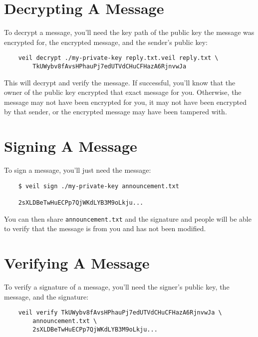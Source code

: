 \documentclass[a4paper]{scrartcl}
\begin{document}
    \section{Decrypting A Message}\label{sec:decrypting-a-message}

    To decrypt a message, you'll need the key path of the public key the message was encrypted for, the encrypted
    message, and the sender's public key:

    \begin{verbatim}
    veil decrypt ./my-private-key reply.txt.veil reply.txt \
        TkUWybv8fAvsHPhauPj7edUTVdCHuCFHazA6RjnvwJa
    \end{verbatim}

    This will decrypt and verify the message.
    If successful, you'll know that the owner of the public key encrypted that exact message for you.
    Otherwise, the message may not have been encrypted for you, it may not have been encrypted by that sender, or the
    encrypted message may have been tampered with.


    \section{Signing A Message}\label{sec:signing-a-message}

    To sign a message, you'll just need the message:

    \begin{verbatim}
    $ veil sign ./my-private-key announcement.txt

    2sXLDBeTwHuECPp7QjWKdLYB3M9oLkju...
    \end{verbatim}

    You can then share \texttt{announcement.txt} and the signature and people will be able to verify that the message is
    from you and has not been modified.


    \section{Verifying A Message}\label{sec:verifying-a-message}

    To verify a signature of a message, you'll need the signer's public key, the message, and the signature:

    \begin{verbatim}
    veil verify TkUWybv8fAvsHPhauPj7edUTVdCHuCFHazA6RjnvwJa \
        announcement.txt \
        2sXLDBeTwHuECPp7QjWKdLYB3M9oLkju...
    \end{verbatim}
\end{document}
